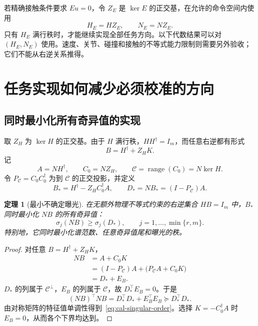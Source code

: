\documentclass[11pt,a4paper]{article}
\numberwithin{equation}{section}
\newtheorem{theorem}{定理}[section]
\theoremstyle{definition}
\begin{document}
若精确接触条件要求 $Eu=0$，令 $Z_E$ 是 $\ker E$ 的正交基，在允许的命令空间内使用
\begin{equation}
  H_E=HZ_E,\qquad N_E=NZ_E .
  \label{eq:cal-contact-reduction}
\end{equation}
只有 $H_E$ 满行秩时，才能继续实现全部任务方向。以下代数结果可以对 $(H_E,N_E)$ 使用。速度、关节、碰撞和接触的不等式能力限制则需要另外验收；它们不能从右逆关系推得。

\section{任务实现如何减少必须校准的方向}
\label{sec:cal-realization}

\subsection{同时最小化所有奇异值的实现}

取 $Z_H$ 为 $\ker H$ 的正交基。由于 $H$ 满行秩，$HH^\dagger=I_m$，而任意右逆都有形式
\begin{equation}
  B=H^\dagger+Z_HK .
  \label{eq:cal-all-lifts}
\end{equation}
记
\begin{equation}
  A=NH^\dagger,\qquad C_0=NZ_H,\qquad
  \mathcal C=\operatorname{range}(C_0)=N\ker H .
\end{equation}
令 $P_{\mathcal C}=C_0C_0^\dagger$ 为到 $\mathcal C$ 的正交投影，并定义
\begin{equation}
  B_*=
  H^\dagger-Z_HC_0^\dagger A,\qquad
  D_*=
  NB_*=(I-P_{\mathcal C})A .
  \label{eq:cal-optimal-lift}
\end{equation}

\begin{theorem}[最小不确定曝光]
\label{thm:cal-singular-opt}
在无额外物理不等式约束的右逆集合 $HB=I_m$ 中，$B_*$ 同时最小化 $NB$ 的所有奇异值：
\begin{equation}
  \sigma_j(NB)\ge\sigma_j(D_*),
  \qquad j=1,\ldots,\min\{r,m\}.
  \label{eq:cal-singular-order}
\end{equation}
特别地，它同时最小化谱范数、任意奇异值尾和曝光的秩。
\end{theorem}

\begin{proof}
对任意 $B=H^\dagger+Z_HK$，
\begin{align}
  NB
  &= A+C_0K\\
  &= (I-P_{\mathcal C})A+
     \big(P_{\mathcal C}A+C_0K\big)\\
  &=D_*+E_B .
\end{align}
$D_*$ 的列属于 $\mathcal C^\perp$，$E_B$ 的列属于 $\mathcal C$，故 $D_*^\top E_B=0$。于是
\begin{equation}
  (NB)^\top NB
  =D_*^\top D_*+E_B^\top E_B
  \succeq D_*^\top D_* .
\end{equation}
由对称矩阵的特征值单调性得到~\eqref{eq:cal-singular-order}。选择 $K=-C_0^\dagger A$ 时 $E_B=0$，从而各个下界均达到。
\end{proof}
\end{document}
